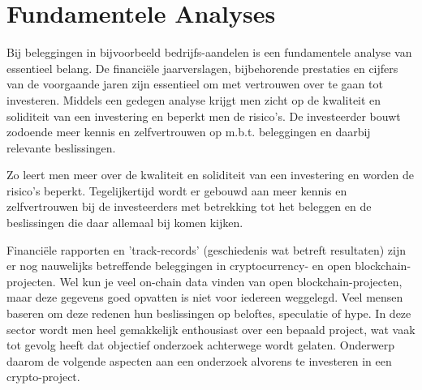 \section{Fundamentele Analyses}
\label{sec:fundamentalanalysis}

Bij beleggingen in bijvoorbeeld bedrijfs-aandelen is een fundamentele analyse van essentieel belang. De financi{\"e}le jaarverslagen, bijbehorende prestaties en cijfers van de voorgaande jaren zijn essentieel om met vertrouwen over te gaan tot investeren. Middels een gedegen analyse krijgt men zicht op de kwaliteit en soliditeit van een investering en beperkt men de risico's. De investeerder bouwt zodoende meer kennis en zelfvertrouwen op m.b.t. beleggingen en daarbij relevante beslissingen. 

Zo leert men meer over de kwaliteit en soliditeit van een investering en worden de risico's beperkt. Tegelijkertijd wordt er gebouwd aan meer kennis en zelfvertrouwen bij de investeerders met betrekking tot het beleggen en de beslissingen die daar allemaal bij komen kijken.\medskip

Financi{\"e}le rapporten en 'track-records' (geschiedenis wat betreft resultaten) zijn er nog nauwelijks betreffende beleggingen in cryptocurrency- en open blockchain-projecten. Wel kun je veel on-chain data vinden van open blockchain-projecten, maar deze gegevens goed opvatten is niet voor iedereen weggelegd. Veel mensen baseren om deze redenen hun beslissingen op beloftes, speculatie of hype. In deze sector wordt men heel gemakkelijk enthousiast over een bepaald project, wat vaak tot gevolg heeft dat objectief onderzoek achterwege wordt gelaten. Onderwerp daarom de volgende aspecten aan een onderzoek alvorens te investeren in een crypto-project.

